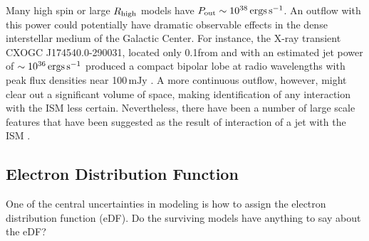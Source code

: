 Many high spin or large $R_\mathrm{high}$ models have $P_\mathrm{out} \sim 10^{38} \,\mathrm{ergs\,s^{-1}}$.
An outflow with this power could potentially have dramatic observable effects in the dense interstellar medium of the Galactic Center.  For instance, the X-ray transient CXOGC J174540.0-290031, located only 0.1\pc from \sgra and with an estimated jet power of $\sim 10^{36}\,\mathrm{ergs\,s^{-1}}$ produced a compact bipolar lobe at radio wavelengths with peak flux densities near 100$\,\mathrm{mJy}$ \citep{2005ApJ...633..218B}.  A more continuous  outflow, however, might clear out a significant volume of space, making identification of any interaction with the ISM less certain.  Nevertheless, there have been a number of large scale features that have been suggested as the result of interaction of a jet with the ISM \citep[e.g.][]{2013ApJ...779..154L,2021ApJ...922..254C}.


\subsection{Electron Distribution Function}

One of the central uncertainties in modeling \sgra is how to assign the electron distribution function (eDF).  Do the surviving models have anything to say about the eDF?

